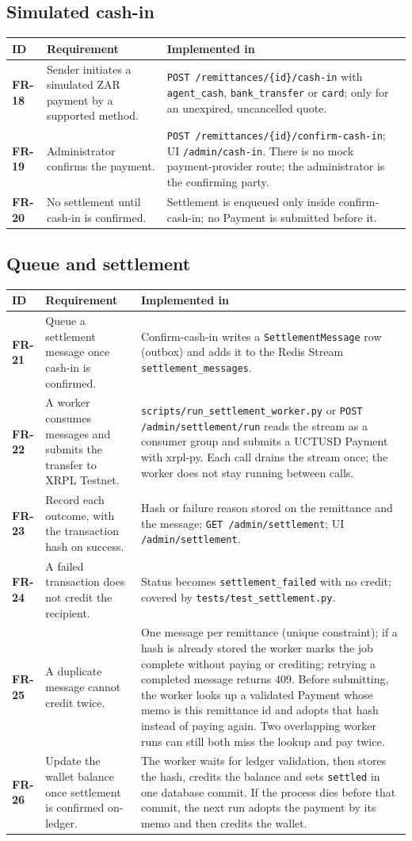 \documentclass[11pt,a4paper]{article}
\makeatletter
\newcommand{\code}[1]{\texttt{\small #1}}
\newenvironment{frtable}{%
  \rowcolors{2}{white}{rowbg}
  \begin{longtable}{@{}>{\bfseries}l >{\RaggedRight\arraybackslash}p{5.5cm} >{\RaggedRight\arraybackslash}p{8.4cm}@{}}
  \toprule
  \rowcolor{headbg}\textbf{ID} & \textbf{Requirement} & \textbf{Implemented in} \\
  \midrule
  \endhead
  \bottomrule
  \endlastfoot}
 {\end{longtable}}
\makeatother
\begin{document}
\subsection{Simulated cash-in}
\begin{frtable}
FR-18 & Sender initiates a simulated ZAR payment by a supported method.
      & \code{POST /remittances/\{id\}/cash-in} with \code{agent\_cash}, \code{bank\_transfer} or \code{card}; only for an unexpired, uncancelled quote. \\
FR-19 & Administrator confirms the payment.
      & \code{POST /remittances/\{id\}/confirm-cash-in}; UI \code{/admin/cash-in}. There is no mock payment-provider route; the administrator is the confirming party. \\
FR-20 & No settlement until cash-in is confirmed.
      & Settlement is enqueued only inside confirm-cash-in; no Payment is submitted before it. \\
\end{frtable}

\subsection{Queue and settlement}
\begin{frtable}
FR-21 & Queue a settlement message once cash-in is confirmed.
      & Confirm-cash-in writes a \code{SettlementMessage} row (outbox) and adds it to the Redis Stream \code{settlement\_messages}. \\
FR-22 & A worker consumes messages and submits the transfer to XRPL Testnet.
      & \code{scripts/run\_settlement\_worker.py} or \code{POST /admin/settlement/run} reads the stream as a consumer group and submits a UCTUSD Payment with xrpl-py. Each call drains the stream once; the worker does not stay running between calls. \\
FR-23 & Record each outcome, with the transaction hash on success.
      & Hash or failure reason stored on the remittance and the message; \code{GET /admin/settlement}; UI \code{/admin/settlement}. \\
FR-24 & A failed transaction does not credit the recipient.
      & Status becomes \code{settlement\_failed} with no credit; covered by \code{tests/test\_settlement.py}. \\
FR-25 & A duplicate message cannot credit twice.
      & One message per remittance (unique constraint); if a hash is already stored the worker marks the job complete without paying or crediting; retrying a completed message returns 409. Before submitting, the worker looks up a validated Payment whose memo is this remittance id and adopts that hash instead of paying again. Two overlapping worker runs can still both miss the lookup and pay twice. \\
FR-26 & Update the wallet balance once settlement is confirmed on-ledger.
      & The worker waits for ledger validation, then stores the hash, credits the balance and sets \code{settled} in one database commit. If the process dies before that commit, the next run adopts the payment by its memo and then credits the wallet. \\
\end{frtable}
\end{document}
